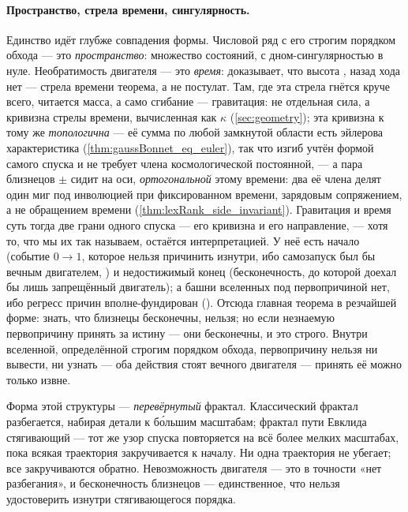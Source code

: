\paragraph{Пространство, стрела времени, сингулярность.}
Единство идёт глубже совпадения формы. Числовой ряд с его строгим порядком обхода — это
\emph{пространство}: множество состояний, с дном-сингулярностью в нуле. Необратимость двигателя — это
\emph{время}:  доказывает, что высота , назад хода нет —
стрела времени теорема, а не постулат. Там, где эта стрела гнётся круче всего, читается масса, а само
сгибание --- гравитация: не отдельная сила, а кривизна стрелы времени, вычисленная как $\kappa$
(\cref{sec:geometry}); эта кривизна к тому же \emph{топологична} --- её сумма по любой замкнутой области
есть эйлерова характеристика (\cref{thm:gaussBonnet_eq_euler}), так что изгиб учтён формой самого спуска
и не требует члена космологической постоянной, --- а пара близнецов $\pm$ сидит на оси,
\emph{ортогональной} этому времени: два её члена делят один миг под инволюцией при фиксированном
времени, зарядовым сопряжением, а не обращением времени (\cref{thm:lexRank_side_invariant}). Гравитация
и время суть тогда две грани одного спуска --- его кривизна и его
направление, --- хотя то, что мы их так называем, остаётся интерпретацией. У неё есть начало (событие $0 \to 1$, которое нельзя причинить
изнутри, ибо самозапуск был бы вечным двигателем, ) и недостижимый
конец (бесконечность, до которой доехал бы лишь запрещённый двигатель); а башни вселенных под
первопричиной нет, ибо регресс причин вполне-фундирован (). Отсюда
главная теорема в резчайшей форме: знать, что близнецы бесконечны, нельзя; но если незнаемую
первопричину принять за истину — они бесконечны, и это строго. Внутри вселенной, определённой строгим
порядком обхода, первопричину нельзя ни вывести, ни узнать — оба действия стоят вечного двигателя —
принять её можно только извне.

Форма этой структуры — \emph{перевёрнутый} фрактал. Классический фрактал разбегается, набирая детали к
б\'{о}льшим масштабам; фрактал пути Евклида стягивающий — тот же узор спуска повторяется на всё более
мелких масштабах, пока всякая траектория закручивается к началу. Ни одна траектория не убегает; все
закручиваются обратно. Невозможность двигателя — это в точности «нет разбегания», и бесконечность
близнецов — единственное, что нельзя удостоверить изнутри стягивающегося порядка.

